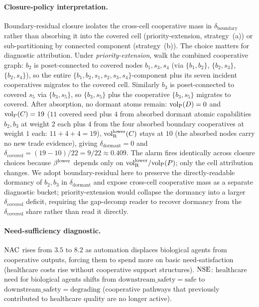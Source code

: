 \paragraph{Closure-policy interpretation.}
Boundary-residual closure isolates the cross-cell cooperative
mass in $\delta_{\mathrm{boundary}}$ rather than absorbing it
into the covered cell (priority-extension, strategy~(a)) or
sub-partitioning by connected component (strategy~(b)).  The
choice matters for diagnostic attribution.  Under
\emph{priority-extension}, walk the combined cooperative graph:
$b_2$ is poset-connected to covered nodes $b_1, s_3, s_4$ (via
$\{b_1, b_2\}$, $\{b_2, s_3\}$, $\{b_2, s_4\}$), so the entire
$\{b_1, b_2, s_1, s_2, s_3, s_4\}$-component plus its seven
incident cooperatives migrates to the covered cell.  Similarly
$b_3$ is poset-connected to covered $s_5$ via $\{b_3, s_5\}$,
so $\{b_3, s_5\}$ plus the cooperative $\{b_3, s_5\}$ migrates
to covered.  After absorption, no dormant atoms remain:
${\operatorname{vol}_{\mathrm{P}}}(D) = 0$ and ${\operatorname{vol}_{\mathrm{P}}}(C) = 19$ ($11$ covered seed plus $4$
from absorbed dormant atomic capabilities $b_2, b_3$ at weight
$2$ each plus $4$ from the four absorbed boundary cooperatives
at weight $1$ each: $11 + 4 + 4 = 19$),
${\operatorname{vol}_{\mathrm{R}}^{\mathrm{lower}}}(C)$ stays at $10$ (the absorbed nodes carry no new
trade evidence), giving
$\delta_{\mathrm{dormant}} = 0$ and
$\delta_{\mathrm{covered}} = (19-10)/22 = 9/22 \approx 0.409$.
The alarm fires identically across closure choices because
$\beta^{\mathrm{lower}}$ depends only on ${\operatorname{vol}_{\mathrm{R}}^{\mathrm{lower}}} / {\operatorname{vol}_{\mathrm{P}}}(P)$; only the
cell attribution changes.  We adopt boundary-residual here to
preserve the directly-readable dormancy of $b_2, b_3$ in
$\delta_{\mathrm{dormant}}$ and expose cross-cell cooperative
mass as a separate diagnostic bucket; priority-extension would
collapse the dormancy into a larger
$\delta_{\mathrm{covered}}$ deficit, requiring the gap-decomp
reader to recover dormancy from the $\delta_{\mathrm{covered}}$
share rather than read it directly.

\paragraph{Need-sufficiency diagnostic.}
$\mathrm{NAC}$ rises from $3.5$ to $8.2$ as automation displaces
biological agents from cooperative outputs, forcing them to spend
more on basic need-satisfaction (healthcare costs rise without
cooperative support structures).  $\mathrm{NSE}$: healthcare need for
biological agents shifts from
$\mathrm{downstream\_safety} = \mathrm{safe}$ to
$\mathrm{downstream\_safety} = \mathrm{degrading}$ (cooperative
pathways that previously contributed to healthcare quality are no
longer active).

